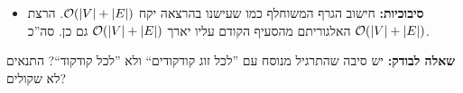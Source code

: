 \documentclass[]{../../../../tex/classes/homework}
\newcommand\squigT{\overset{T}{\squig}}
\begin{document}
\begin{enumerate}[(A)]
\begin{itemize}
\begin{itemize}
				\item \textbf{תשובה חיובית היא נכונה: }אם האלגוריתם החזיר תשובה חיובית, אז קיים $w \in V$ כך שלכל קודקוד $v \in V$ קיים מסלול $w \squigT v$ ב־$G^{T}$, כלומר מסלול $v \squig w$ ב־$G$. יהיו $u, v \in V$. ממה שעתה כתבנו קיים בפרט עבור $u, v$ מסלול $u \squig w$ ו־$v \squig w$ ב־$G$ כנדרש. 
				\item \textbf{תשובה שלילית היא נכונה: }אם האלגוריתם החזיר תשובה שלילית, אז לכל $w \in V$ קיים $v \in V$ כך שאין מסלול $w \squigT v$ ב־$G^{T}$, כלומר אין מסלול $v \squig w$ ב־$G$. לכן לכל $w \in V$, אפשר לבחור $v \in V$ כך שאין מסלול $v \squig w$, ועוד $u \in V$ כלשהו (לדוגמה $u = v$). ואז אין מסלול $v \squig w$ וגם מסלול $u \squig w$ (כי הראשון לא קיים, וזוהי טענת וגם). 
			\end{itemize}
			\item \textbf{סיבוכיות: }חישוב הגרף המשוחלף כמו שעישנו בהרצאה יקח $\mathcal{O}(\left \lvert V \right \rvert + \left \lvert E \right \rvert)$. הרצת האלגוריתם מהסעיף הקודם עליו יארך $\mathcal{O}(\left \lvert V \right \rvert + \left \lvert E \right \rvert)$ גם כן. סה''כ $\mathcal{O}(\left \lvert V \right \rvert + \left \lvert E \right \rvert)$. 
		\end{itemize}
		
		\textbf{שאלה לבודק: }יש סיבה שהתרגיל מנוסח עם ''לכל זוג קודקודים`` ולא ''לכל קודקוד``? התנאים לא שקולים? 
	\end{enumerate}
	
	
	
	\ndoc
\end{document}
